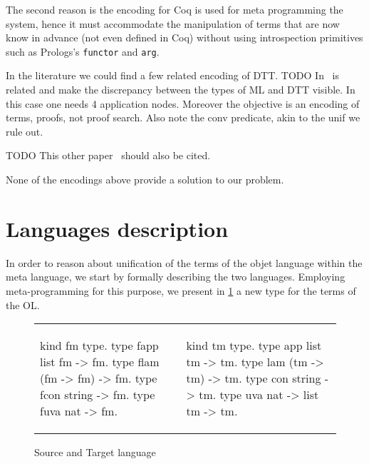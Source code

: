 \documentclass[sigconf,natbib=false]{acmart}
\begin{document}
\noindent
The second reason is the encoding for Coq is used for meta programming the
system, hence it must accommodate the manipulation of terms that are now
know in advance (not even defined in Coq) without using introspection
primitives such as Prologs's \texttt{functor} and \texttt{arg}.

In the literature we could find a few related encoding of DTT.
TODO In~\cite{felty93lics} is related and make the
discrepancy between the types of ML and DTT visible. In this case
one needs 4 application nodes. Moreover the objective is an encoding
of terms, proofs, not proof search. Also note the conv predicate,
akin to the unif we rule out.

TODO This other paper~\cite{10.1007/978-3-031-38499-8_25} should also be cited.

None of the encodings above provide a solution to our problem.

\section{Languages description}
\label{sec:lang-spec}

% 


\def\eqfo{eq\_fo\xspace}

In order to reason about unification of the terms of the objet language within the
meta language, we start by formally describing the two languages. Employing
meta-programming for this purpose, we present in \cref{code:common-terms} a new type for the terms of
the OL.
%
\setlength{\abovecaptionskip}{0pt}
\setlength{\belowcaptionskip}{-13pt}

\begin{figure}[H]
  \begin{tabular}{ll}
  \begin{minipage}{0.21\textwidth}
  \begin{elpicodetab}
kind fm type.
type fapp list fm -> fm.
type flam (fm -> fm) -> fm.
type fcon string -> fm.
type fuva nat -> fm.
\end{elpicodetab}
  \end{minipage}
  &
  \begin{minipage}{0.24\textwidth}
  \begin{elpicodetab}
kind tm type.
type app list tm -> tm.
type lam (tm -> tm) -> tm.
type con string -> tm.
type uva nat -> list tm -> tm.
  \end{elpicodetab}
  \end{minipage}
  \end{tabular}
  \caption{Source and Target language}
  \label{code:common-terms}
\end{figure}
\end{document}
